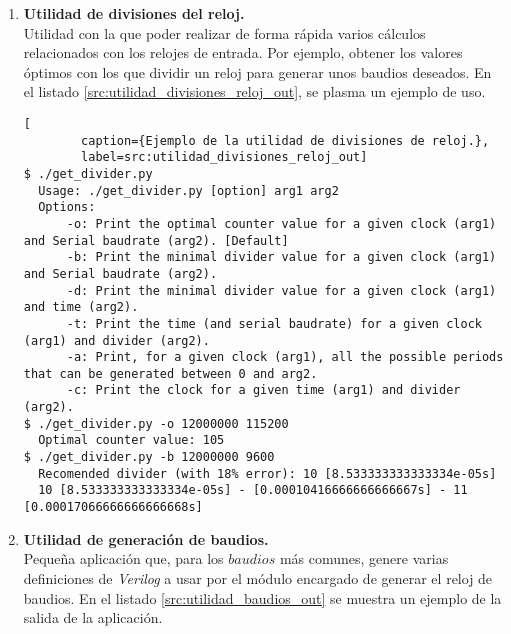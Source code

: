 \begin{enumerate}
    \item \textbf{Utilidad de divisiones del reloj.} \\
    Utilidad con la que poder realizar de forma rápida varios cálculos relacionados con los relojes de entrada. Por ejemplo, obtener los valores óptimos con los que dividir un reloj para generar unos baudios deseados. En el listado \ref{src:utilidad_divisiones_reloj_out}, se plasma un ejemplo de uso.
    \begin{lstlisting}[
        caption={Ejemplo de la utilidad de divisiones de reloj.},
        label=src:utilidad_divisiones_reloj_out]
$ ./get_divider.py
  Usage: ./get_divider.py [option] arg1 arg2
  Options: 
      -o: Print the optimal counter value for a given clock (arg1) and Serial baudrate (arg2). [Default]
      -b: Print the minimal divider value for a given clock (arg1) and Serial baudrate (arg2).
      -d: Print the minimal divider value for a given clock (arg1) and time (arg2).
      -t: Print the time (and serial baudrate) for a given clock (arg1) and divider (arg2).
      -a: Print, for a given clock (arg1), all the possible periods that can be generated between 0 and arg2.
      -c: Print the clock for a given time (arg1) and divider (arg2).
$ ./get_divider.py -o 12000000 115200
  Optimal counter value: 105
$ ./get_divider.py -b 12000000 9600
  Recomended divider (with 18% error): 10 [8.533333333333334e-05s]
  10 [8.533333333333334e-05s] - [0.00010416666666666667s] - 11 [0.00017066666666666668s]          
    \end{lstlisting}
    
    \item \textbf{Utilidad de generación de baudios.} \\
    Pequeña aplicación que, para los $baudios$ más comunes, genere varias definiciones de \emph{Verilog} a usar por el módulo encargado de generar el reloj de baudios. En el listado \ref{src:utilidad_baudios_out} se muestra un ejemplo de la salida de la aplicación.
    

\end{enumerate}
